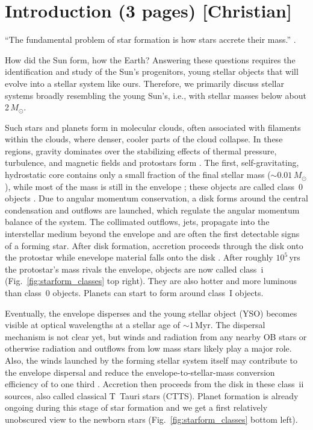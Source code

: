 
\section{Introduction {\normalfont (3 pages) [Christian]}}

``The fundamental problem of star formation is how stars accrete their mass.'' \citep{Dunham_2014}.


How did the Sun form, how the Earth? Answering these questions requires the identification and study of the Sun's progenitors,  young stellar objects that will evolve into a stellar system like ours. Therefore, we primarily discuss stellar systems broadly resembling the young Sun's, i.e., with stellar masses below about 2$\,M_\odot$.

Such stars and planets form in molecular clouds, often associated with filaments within the clouds,  where denser, cooler parts of the cloud collapse. In these regions, gravity dominates over the stabilizing effects of thermal pressure, turbulence, and magnetic fields \citep[e.g., ][]{McKee_2007} and protostars form  \citep{Andre_2014}. The first, self-gravitating, hydrostatic core contains only a small fraction of the final stellar mass ($\sim0.01\,M_\odot$), while most of the mass is still in the envelope \citep[e.g.,][]{Gong_2015,Lee_2020}; these objects are called class~0 objects \citep[see Fig.~\ref{fig:starform_classes} top left, and ][]{Andre_1993, Larson_2003}. Due to angular momentum conservation, a disk forms around the central condensation and outflows are launched, which regulate the angular momentum balance of the system. The collimated outflows, jets, propagate into the interstellar medium beyond the envelope and are often the first detectable signs of a forming star. After disk formation, accretion proceeds through the disk onto the protostar while enevelope material falls onto the disk \citep{Padoan_2014}. After roughly $10^5$\,yrs the protostar's mass rivals the envelope, objects are now called class~{\sc i} (Fig.~\ref{fig:starform_classes} top right). They are also hotter and more luminous than class~0 objects. Planets can start to form around class~I objects.

Eventually, the envelope disperses and the young stellar object (YSO) becomes visible at optical wavelengths at a stellar age of $\sim1\,$Myr. The dispersal mechanism is not clear yet, but winds and radiation from any nearby OB stars or otherwise radiation and outflows from low mass stars likely play a major role. Also, the winds launched by the forming stellar system itself may contribute to the envelope dispersal and reduce the envelope-to-stellar-mass conversion efficiency of to one third \citep{Frank_2014}. Accretion then proceeds from the disk in these class~{\sc ii} sources, also called classical T~Tauri stars (CTTS). Planet formation is already ongoing during this stage of star formation and we get a first relatively unobscured view to the newborn stars (Fig.~\ref{fig:starform_classes} bottom left).

